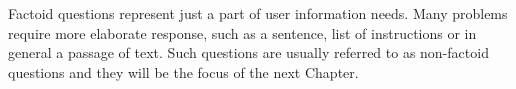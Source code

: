 Factoid questions represent just a part of user information needs. Many problems require more elaborate response, such as a sentence, list of instructions or in general a passage of text.
Such questions are usually referred to as non-factoid questions and they will be the focus of the next Chapter.

\clearpage




